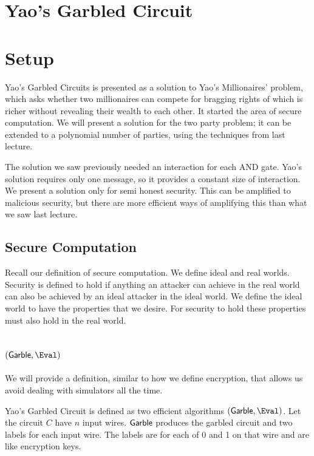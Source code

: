 \section{Yao's Garbled Circuit}


%

\section{Setup}


Yao's Garbled Circuits is presented as a solution to Yao's Millionaires' problem, 
which asks whether 
two millionaires can compete for bragging rights of which is richer
without revealing their wealth to each other. 
It started the area of secure computation. 
We will present a solution for the two party problem;
it can be extended to a polynomial number of parties,
using the techniques from last lecture.

The solution we saw previously needed an interaction for each AND gate.
Yao's solution requires only one message,
so it provides a constant size of interaction.
We present a solution only for semi honest security. 
This can be amplified to malicious security, 
but there are more efficient ways of amplifying this than what we saw last lecture.

\subsection{Secure Computation}

Recall our definition of secure computation. 
We define ideal and real worlds. 
Security is defined to hold if 
anything an attacker can achieve in the real world 
 can also be achieved by an ideal attacker in the ideal world. 
We define the ideal world to have the properties that we desire. 
For security to hold these properties must also hold in the real world.

\subsection{$(\Garble, \Eval)$}
We will provide a definition, similar to how we define encryption, that allows us avoid dealing with simulators all the time. 


Yao's Garbled Circuit is defined as two efficient algorithms $(\Garble, \Eval)$. Let the circuit $C$ have $n$ input wires.
$\mathsf{Garble}$ produces the garbled circuit and two labels for each input wire. The labels are for each of 0 and 1 on that wire and are like encryption keys. 

